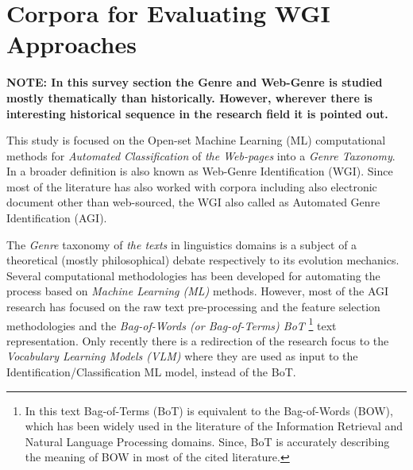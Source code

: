 
\section{Corpora for Evaluating WGI Approaches}

\textbf{NOTE: In this survey section the Genre and Web-Genre is studied mostly thematically than historically. However, wherever there is interesting historical sequence in the research field it is pointed out.}

This study is focused on the Open-set Machine Learning (ML) computational methods for \textit{Automated Classification} of \textit{the Web-pages} into a \textit{Genre Taxonomy}. In a broader definition is also known as Web-Genre Identification (WGI). Since most of the literature has also worked with corpora including also electronic document other than web-sourced, the WGI also called as Automated Genre Identification (AGI).

The \textit{Genre} taxonomy of \textit{the texts} in linguistics domains is a subject of a theoretical (mostly philosophical) debate respectively to its evolution mechanics. Several computational methodologies has been developed for automating the process based on \textit{Machine Learning (ML)} methods. However, most of the AGI research has focused on the raw text pre-processing and the feature selection methodologies and the \textit{Bag-of-Words (or Bag-of-Terms) BoT }\footnote{In this text Bag-of-Terms (BoT) is equivalent to the Bag-of-Words  (BOW), which has been widely used in the literature of the Information Retrieval and Natural Language Processing domains. Since, BoT is accurately describing the meaning of BOW in most of the cited literature.} text representation. Only recently there is a redirection of the research focus to the \textit{Vocabulary Learning Models (VLM)} where they are used as input to the Identification/Classification ML model, instead of the BoT. 






